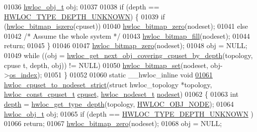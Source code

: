 \begin{DoxyCode}
01036         \hyperlink{a00016}{hwloc_obj_t} obj;
01037 
01038         \textcolor{keywordflow}{if} (depth == \hyperlink{a00046_ggaf4e663cf42bbe20756b849c6293ef575a0565ab92ab72cb0cec91e23003294aad}{HWLOC_TYPE_DEPTH_UNKNOWN}) \{
01039                  \textcolor{keywordflow}{if} (\hyperlink{a00065_gaa94fed35d2a598bc4a8657b6955b7bf5}{hwloc_bitmap_iszero}(cpuset))
01040                         \hyperlink{a00065_ga6c540b9fe63b8223b6aba46d56dd63b8}{hwloc_bitmap_zero}(nodeset);
01041                 \textcolor{keywordflow}{else}
01042                         \textcolor{comment}{/* Assume the whole system */}
01043                         \hyperlink{a00065_ga52456f7ef79d68e610cb65e3f7ffafad}{hwloc_bitmap_fill}(nodeset);
01044                 \textcolor{keywordflow}{return};
01045         \}
01046 
01047         \hyperlink{a00065_ga6c540b9fe63b8223b6aba46d56dd63b8}{hwloc_bitmap_zero}(nodeset);
01048         obj = NULL;
01049         \textcolor{keywordflow}{while} ((obj = \hyperlink{a00056_ga2f9a4ec15e9cfae8c21501257a51ce5b}{hwloc_get_next_obj_covering_cpuset_by_depth}(topology, cpuse
      t, depth, obj)) != NULL)
01050                 \hyperlink{a00065_ga497556af0cc34f109ae0277999c074d3}{hwloc_bitmap_set}(nodeset, obj->\hyperlink{a00016_a61a7a80a68eaccbaaa28269e678c81a9}{os_index});
01051 \}
01052 
01060 \textcolor{keyword}{static} \_\_hwloc\_inline \textcolor{keywordtype}{void}
\hypertarget{a00031_source_l01061}{}\hyperlink{a00062_ga9162785e39d7c697f76f99524c4a2fb4}{01061} \hyperlink{a00062_ga9162785e39d7c697f76f99524c4a2fb4}{hwloc_cpuset_to_nodeset_strict}(\textcolor{keyword}{struct} hwloc\_topology *topology, 
      \hyperlink{a00040_ga1f784433e9b606261f62d1134f6a3b25}{hwloc_const_cpuset_t} \hyperlink{a00016_a67925e0f2c47f50408fbdb9bddd0790f}{cpuset}, \hyperlink{a00040_ga37e35730fa7e775b5bb0afe893d6d508}{hwloc_nodeset_t} \hyperlink{a00016_a08f0d0e16c619a6e653526cbee4ffea3}{nodeset})
01062 \{
01063         \textcolor{keywordtype}{int} \hyperlink{a00016_a9d82690370275d42d652eccdea5d3ee5}{depth} = \hyperlink{a00046_gaea7c64dd59467f5201ba87712710b14d}{hwloc_get_type_depth}(topology, \hyperlink{a00041_ggacd37bb612667dc437d66bfb175a8dc55aaf0964881117bdedf1a5e9332cd120dd}{HWLOC_OBJ_NODE});
01064         \hyperlink{a00016}{hwloc_obj_t} obj;
01065         \textcolor{keywordflow}{if} (depth == \hyperlink{a00046_ggaf4e663cf42bbe20756b849c6293ef575a0565ab92ab72cb0cec91e23003294aad}{HWLOC_TYPE_DEPTH_UNKNOWN} )
01066                 \textcolor{keywordflow}{return};
01067         \hyperlink{a00065_ga6c540b9fe63b8223b6aba46d56dd63b8}{hwloc_bitmap_zero}(nodeset);
01068         obj = NULL;

\end{DoxyCode}
